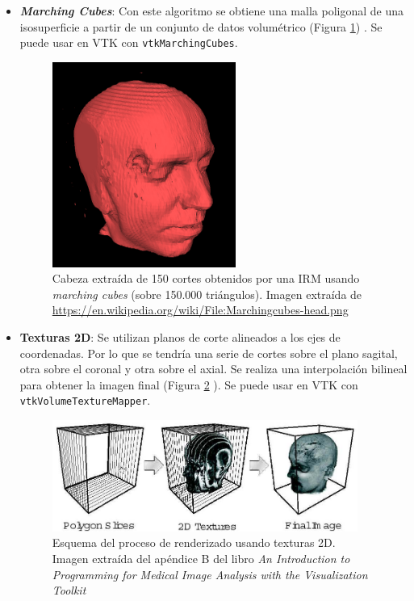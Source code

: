 \begin{itemize}
	\item \textbf{\textit{Marching Cubes}}: Con este algoritmo se obtiene una malla poligonal de una isosuperficie a partir de un conjunto de datos volumétrico (Figura \ref{fig:marching_cubes_head}) \cite{marching_cubes}. Se puede usar en VTK con \texttt{vtkMarchingCubes}.
	\begin{figure}[H]
		\centering
		\includegraphics[width=6cm]{imagenes/marching_cubes_head}
		\caption{Cabeza extraída de 150 cortes obtenidos por una IRM usando \textit{marching cubes} (sobre 150.000 triángulos). Imagen extraída de \url{https://en.wikipedia.org/wiki/File:Marchingcubes-head.png}}
		\label{fig:marching_cubes_head}
	\end{figure}
	
	\item \textbf{Texturas 2D}: Se utilizan planos de corte alineados a los ejes de coordenadas. Por lo que se tendría una serie de cortes sobre el plano sagital, otra sobre el coronal y otra sobre el axial. Se realiza una interpolación bilineal para obtener la imagen final (Figura \ref{fig:texturas2d} \cite{intro_medical_vtk_bioimage}). Se puede usar en VTK con \texttt{vtkVolumeTextureMapper}.
	\begin{figure}[H]
		\centering
		\includegraphics[width=10cm]{imagenes/texturas2d}
		\caption{Esquema del proceso de renderizado usando texturas 2D. Imagen extraída del apéndice B del libro \textit{An Introduction to Programming for Medical Image Analysis with the Visualization Toolkit }\cite{intro_medical_vtk_bioimage}}
		\label{fig:texturas2d}
	\end{figure}
	

\end{itemize}
